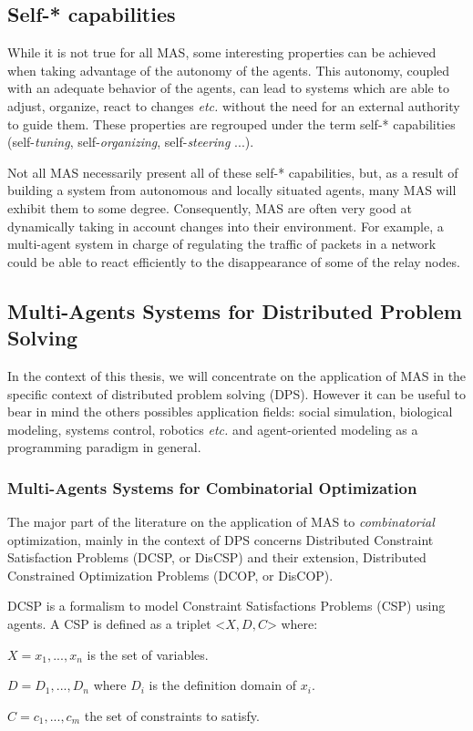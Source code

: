 \subsection{Self-* capabilities}

While it is not true for all MAS, some interesting properties can be achieved when taking advantage of the autonomy of the agents. This autonomy, coupled with an adequate behavior of the agents, can lead to systems which are able to adjust, organize, react to changes \emph{etc.} without the need for an external authority to guide them. These properties are regrouped under the term self-* capabilities (self-\emph{tuning}, self-\emph{organizing}, self-\emph{steering} ...).

Not all MAS necessarily present all of these self-* capabilities, but, as a result of building a system from autonomous and locally situated agents, many MAS will exhibit them to some degree. Consequently, MAS are often very good at dynamically taking in account changes into their environment. For example, a multi-agent system in charge of regulating the traffic of packets in a network could be able to react efficiently to the disappearance of some of the relay nodes.



\subsection{Multi-Agents Systems for Distributed Problem Solving}

In the context of this thesis, we will concentrate on the application of MAS in the specific context of distributed problem solving (DPS). However it can be useful to bear in mind the others possibles application fields: social simulation, biological modeling, systems control, robotics \emph{etc.} and agent-oriented modeling as a programming paradigm in general.

\subsubsection{Multi-Agents Systems for Combinatorial Optimization}

The major part of the literature on the application of MAS to \emph{combinatorial} optimization, mainly in the context of DPS concerns Distributed Constraint Satisfaction Problems (DCSP, or DisCSP) and their extension, Distributed Constrained Optimization Problems (DCOP, or DisCOP).

DCSP is a formalism to model Constraint Satisfactions Problems (CSP) using agents. A CSP is defined as a triplet <$X,D,C$> where:
\begin{compactitem}
\item $X = {x_1, ..., x_n}$ is the set of variables.
\item $D = {D_1, ..., D_n}$ where $D_i$ is the definition domain of $x_i$.
\item $C ={c_1, ..., c_m}$ the set of constraints to satisfy.
\end{compactitem}

